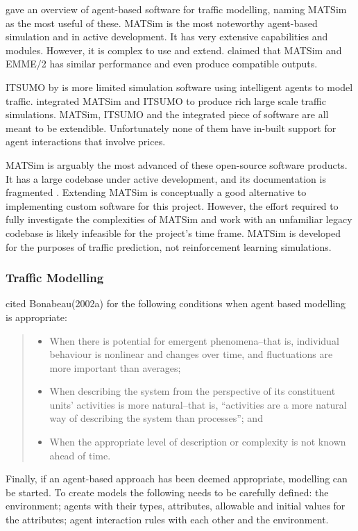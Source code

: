 \textcite{Bernhardt2007taxi+agent} gave an overview of agent-based software for
traffic modelling, naming MATSim as the most useful of these. MATSim is the most
noteworthy agent-based simulation and in active development. It has very
extensive capabilities and modules. However, it is complex to use and extend.
\textcite{Gao2010taxi+comparison} claimed that MATSim and EMME/2 has similar
performance and even produce compatible outputs.

ITSUMO by \textcite{Silva2006itsumo} is more limited simulation software using
intelligent agents to model traffic. \textcite{Bazzan2009integrating}
integrated  MATSim and ITSUMO to produce rich large scale traffic simulations.
MATSim, ITSUMO and the integrated piece of software are all meant to be
extendible. Unfortunately none of them have in-built support for agent
interactions that involve prices.

MATSim is arguably the most advanced of these open-source software products. It
has a large codebase under active development, and its documentation is
fragmented \textcite{Matsim2012}. Extending MATSim is conceptually a good
alternative to implementing custom software for this project. However, the
effort required to fully investigate the complexities of MATSim and work with
an unfamiliar legacy codebase is likely infeasible for the project's time
frame. MATSim is developed for the purposes of traffic prediction, not
reinforcement learning simulations.


\subsubsection{Traffic Modelling}

\textcite[78]{Bernhardt2007taxi+agent} cited Bonabeau(2002a) for the following
conditions when agent based modelling is appropriate:

\begin{quote}
\begin{itemize}
  \item When there is potential for emergent phenomena--that is, individual 
  behaviour is nonlinear and changes over time, and fluctuations are more 
  important than averages;
  \item When describing the system from the perspective of its constituent 
  units’ activities is more natural--that is, “activities are a more natural way
  of describing the system than processes”; and
  \item When the appropriate level of description or complexity is not known 
  ahead of time.
\end{itemize}
\end{quote}

Finally, if an agent-based approach has been deemed appropriate, modelling can
be started. To create models the following needs to be carefully defined: the
environment; agents with their types, attributes, allowable and initial values
for the attributes; agent interaction rules with each other and the
environment. \parencite{Bernhardt2007taxi+agent}

